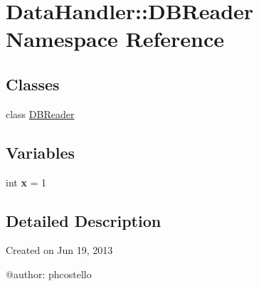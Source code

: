 \hypertarget{namespaceDataHandler_1_1DBReader}{\section{\-Data\-Handler\-:\-:\-D\-B\-Reader \-Namespace \-Reference}
\label{namespaceDataHandler_1_1DBReader}
}
\subsection*{\-Classes}
\begin{DoxyCompactItemize}
\item 
class \hyperlink{classDataHandler_1_1DBReader_1_1DBReader}{\-D\-B\-Reader}
\end{DoxyCompactItemize}
\subsection*{\-Variables}
\begin{DoxyCompactItemize}
\item 
\hypertarget{namespaceDataHandler_1_1DBReader_a3535c80ce0b95417a123712e34c80c2e}{int {\bfseries x} = 1}\label{namespaceDataHandler_1_1DBReader_a3535c80ce0b95417a123712e34c80c2e}

\end{DoxyCompactItemize}


\subsection{\-Detailed \-Description}
\begin{DoxyVerb}
Created on Jun 19, 2013

@author: phcostello
\end{DoxyVerb}
 